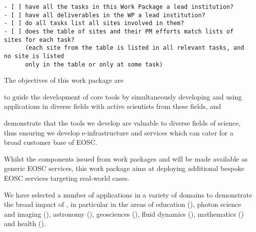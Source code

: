 \begin{draft}
\begin{verbatim}
- [ ] have all the tasks in this Work Package a lead institution?
- [ ] have all deliverables in the WP a lead institution?
- [ ] do all tasks list all sites involved in them?
- [ ] does the table of sites and their PM efforts match lists of sites for each task?
      (each site from the table is listed in all relevant tasks, and no site is listed
      only in the table or only at some task)
\end{verbatim}
\end{draft}

\begin{workpackage}[id=applications,wphases=0-48,swsites,
  title=Science demonstrators,
  short=Demonstrators,
  lead=XFEL,
  EGIRM=7,
  CDSRM=12,
  INSERMRM=24,
  QSRM=6,
  SILRM=12,
  SRLRM=9,
  UIORM=12,
  UPSUDRM=20,
  WTTRM=3,
  XFELRM=36,
  EPRM=3,
]
\begin{wpobjectives}
  The objectives of this work package are
 \begin{compactitem}
   \item to guide the development of core tools by simultaneously
     developing and using applications in diverse fields with active
     scientists from these fields, and
   \item demonstrate that the tools we develop are valuable to diverse
     fields of science, thus ensuring we develop e-infrastructure and
     services which can cater for a broad customer base of EOSC.
 \end{compactitem}
\end{wpobjectives}

\begin{wpdescription}

  Whilst the components issued from work packages   and  will be
  made available as generic EOSC services, this work package aims at deploying additional bespoke EOSC services
  targeting real-world cases.

  We have selected a number of applications in a variety of domains
  to demonstrate the broad impact of \TheProject, in particular in the
  areas of education (), photon science and
  imaging (), astronomy
  (), geosciences (), 
  fluid dynamics (), 
  mathematics () and health ().


\end{wpdescription}
\end{workpackage}
